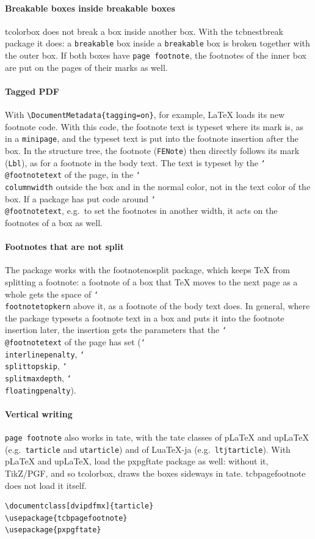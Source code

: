 \documentclass{article}
\newcommand*\cs[1]{\texttt{\char`\\#1}}
\newcommand*\pkg[1]{\textsf{#1}}
\newcommand*\key[1]{\texttt{#1}}
\begin{document}
\paragraph{Breakable boxes inside breakable boxes}
\pkg{tcolorbox} does not break a box inside another box.  With the
\pkg{tcbnestbreak} package it does: a \key{breakable} box inside a
\key{breakable} box is broken together with the outer box.  If both
boxes have \key{page footnote}, the footnotes of the inner box are put
on the pages of their marks as well.

\paragraph{Tagged PDF}
With \verb|\DocumentMetadata{tagging=on}|, for example, \LaTeX{} loads
its new footnote code.  With this code, the footnote text is typeset
where its mark is, as in a \texttt{minipage}, and the typeset text is
put into the footnote insertion after the box.  In the structure tree,
the footnote (\texttt{FENote}) then directly follows its mark
(\texttt{Lbl}), as for a footnote in the body text.  The text is
typeset by the \cs{@footnotetext} of the page, in the \cs{columnwidth}
outside the box and in the normal color, not in the text color of the
box.  If a package has put code around \cs{@footnotetext}, e.g.\ to set
the footnotes in another width, it acts on the footnotes of a box as
well.

\paragraph{Footnotes that are not split}
The package works with the \pkg{footnotenosplit} package, which keeps
\TeX{} from splitting a footnote: a footnote of a box that \TeX{} moves
to the next page as a whole gets the space of \cs{footnotetopkern}
above it, as a footnote of the body text does.  In general, where the
package typesets a footnote text in a box and puts it into the
footnote insertion later, the insertion gets the parameters that the
\cs{@footnotetext} of the page has set (\cs{interlinepenalty},
\cs{splittopskip}, \cs{splitmaxdepth}, \cs{floatingpenalty}).

\paragraph{Vertical writing}
\key{page footnote} also works in tate, with the tate classes of
p\LaTeX{} and up\LaTeX{} (e.g.\ \texttt{tarticle} and
\texttt{utarticle}) and of Lua\TeX-ja (e.g.\ \texttt{ltjtarticle}).  With p\LaTeX{}
and up\LaTeX, load the \pkg{pxpgftate} package as well: without it,
TikZ/PGF, and so \pkg{tcolorbox}, draws the boxes sideways in tate.
\pkg{tcbpagefootnote} does not load it itself.
\begin{verbatim}
\documentclass[dvipdfmx]{tarticle}
\usepackage{tcbpagefootnote}
\usepackage{pxpgftate}
\end{verbatim}
\end{document}
